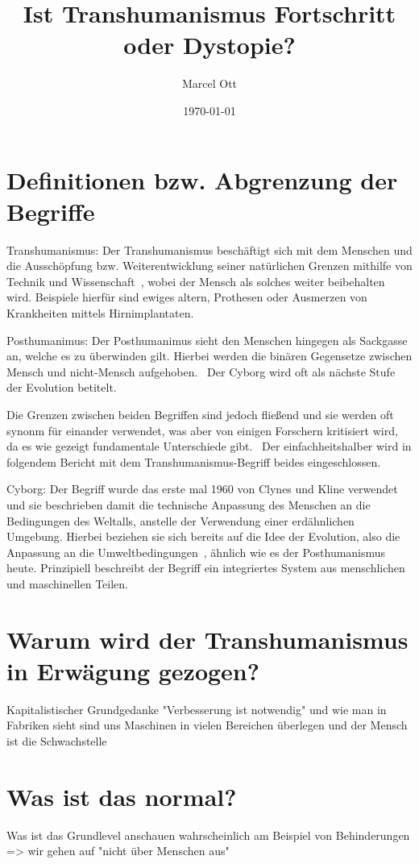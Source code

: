 \documentclass[a4paper,
DIV=13,
12pt,
BCOR=10mm,
department=FakEI,
twoside,
parskip=half,
automark,
]{OTHRartcl}
\date{\today}
\title{Ist Transhumanismus Fortschritt oder Dystopie?}
\author{Marcel Ott}
\begin{document}
\maketitle

\section*{Definitionen bzw. Abgrenzung der Begriffe}

Transhumanismus: Der Transhumanismus beschäftigt sich mit dem Menschen und die Ausschöpfung bzw. Weiterentwicklung seiner natürlichen Grenzen mithilfe von Technik und Wissenschaft~\cite{Merzlyakov2022},
wobei der Mensch als solches weiter beibehalten wird. Beispiele hierfür sind ewiges altern, Prothesen oder Ausmerzen von Krankheiten mittels Hirnimplantaten.

Posthumanimus: Der Posthumanimus sieht den Menschen hingegen als Sackgasse an, welche es zu überwinden gilt. Hierbei werden die binären Gegensetze zwischen Mensch und nicht-Mensch aufgehoben.~\cite{Merzlyakov2022}
Der Cyborg wird oft als nächste Stufe der Evolution betitelt.

Die Grenzen zwischen beiden Begriffen sind jedoch fließend und sie werden oft synonm für einander verwendet, was aber von einigen Forschern kritisiert wird, da es wie gezeigt fundamentale Unterschiede gibt.~\cite{Merzlyakov2022}
Der ein­fach­heits­hal­ber wird in folgendem Bericht mit dem Transhumanismus-Begriff beides eingeschlossen.

Cyborg: Der Begriff wurde das erste mal 1960 von Clynes und Kline verwendet und sie beschrieben damit die technische Anpassung des Menschen an die Bedingungen des Weltalls, anstelle der Verwendung 
einer erdähnlichen Umgebung. Hierbei beziehen sie sich bereits auf die Idee der Evolution, also die Anpassung an die Umweltbedingungen~\cite{clynes1960cyborgs}, ähnlich wie es der Posthumanismus heute.
Prinzipiell beschreibt der Begriff ein integriertes System aus menschlichen und maschinellen Teilen.~\cite{warwick2000cyborg}

\section*{Warum wird der Transhumanismus in Erwägung gezogen?}
Kapitalistischer Grundgedanke "Verbesserung ist notwendig" und wie man in Fabriken sieht sind uns Maschinen in vielen Bereichen überlegen und der Mensch ist die Schwachstelle

\section*{Was ist das normal?}
Was ist das Grundlevel anschauen wahrscheinlich am Beispiel von Behinderungen => wir gehen auf "nicht über Menschen aus"
\end{document}
